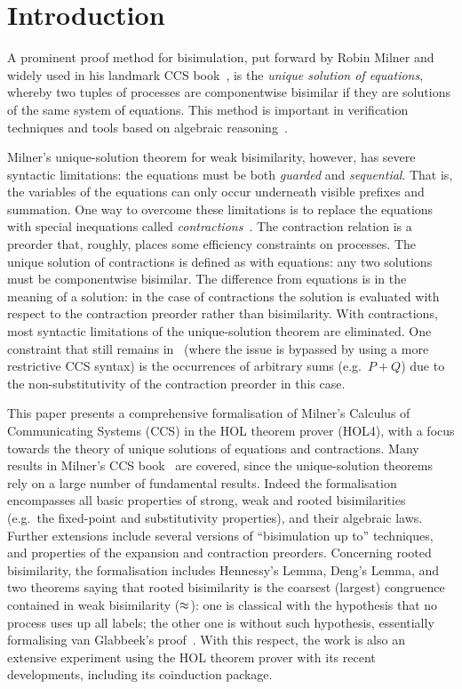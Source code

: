 \section{Introduction}

A prominent proof method for bisimulation, put forward by Robin Milner and widely used in his
landmark CCS book~\cite{Mil89}, is the
\emph{unique solution of equations}, whereby two tuples of processes are
componentwise bisimilar if they are solutions of the same system of equations.
This method is important in verification techniques and tools
based on algebraic reasoning~\cite{BaeBOOK,theoryAndPractice,RosUnder10}. 

Milner's unique-solution theorem for weak bisimilarity, however,
has severe syntactic limitations:
the equations must be both \emph{guarded} and \emph{sequential}. That is,
the variables of the equations can only occur underneath visible prefixes and summation.
One way to overcome these limitations is to replace the equations
with special inequations called
\emph{contractions}~\cite{sangiorgi2015equations,sangiorgi2017equations}. The
contraction relation is a
preorder that, roughly, places some efficiency constraints on processes.
The unique solution of contractions is defined as with equations:
any two solutions must be componentwise bisimilar.
The difference from equations is in the meaning of a solution:
in the case of contractions the solution is evaluated with respect to
the contraction preorder rather than bisimilarity. 
With contractions, most syntactic limitations of the unique-solution theorem are
eliminated. One constraint that still remains
in~\cite{sangiorgi2017equations}
(where the issue is bypassed by using a more
restrictive CCS syntax)
is the occurrences of arbitrary sums (e.g.~$P + Q$) due to
the non-substitutivity of the contraction preorder in this case.

This paper presents a comprehensive formalisation of Milner's Calculus of Communicating
Systems (CCS) in the HOL theorem prover (HOL4),
with a focus towards the theory of unique solutions of equations and contractions.
Many results in Milner's CCS book~\cite{Mil89} are covered, since
the unique-solution theorems rely on a large number of fundamental results.
Indeed the formalisation encompasses all basic properties of strong,
weak and rooted
bisimilarities (e.g.~the fixed-point and substitutivity properties), and their algebraic laws.
Further extensions include several versions of ``bisimulation up to''
techniques, and properties of the expansion and contraction preorders.
Concerning rooted bisimilarity, the formalisation
includes Hennessy's Lemma, Deng's Lemma,
 and two theorems saying that rooted bisimilarity is the coarsest (largest)
 congruence contained in weak bisimilarity ($\approx$): one is classical
 with the hypothesis that no process uses up all labels;
the other one is 
without such hypothesis, essentially formalising van Glabbeek's proof~\cite{van2005characterisation}.
With this respect, the work is also an extensive experiment using the HOL theorem prover with its
recent developments, including its coinduction package.

